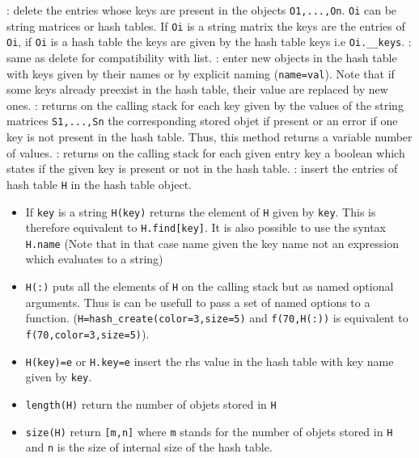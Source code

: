   \begin{varlist}
  : delete the entries whose keys are present in the objects
  \verb+O1,...,On+. \verb+Oi+ can be string matrices or hash tables. If \verb+Oi+ is 
  a string matrix the keys are the entries of \verb+Oi+, if \verb+Oi+ is a hash table the 
  keys are given by the hash table keys i.e \verb+Oi.__keys+.
  : same as delete for compatibility with list.
  : enter new objects in the hash table with keys 
  given by their names or by explicit naming (\verb+name=val+). Note that if some keys 
  already preexist in the hash table, their value are replaced by new ones. 
  : returns on the calling stack for each key given by the values of 
  the string matrices \verb+S1,...,Sn+ the corresponding stored objet if present or an 
  error if one key is not present in the hash table. Thus, this method returns a variable 
  number of values. 
  : returns on the calling stack for each given entry key a boolean 
  which states if the given key is present or not in the hash table.
  : insert the entries of hash table \verb+H+ in the hash table object.
  \end{varlist}

\begin{itemize}
\item If \verb+key+ is a string \verb+H(key)+ returns the element of \verb+H+ given by \verb+key+. 
  This is therefore equivalent to \verb+H.find[key]+. It is also possible to use 
  the syntax \verb+H.name+ (Note that in that case name given the key name not an expression 
  which evaluates to a string) 
\item \verb+H(:)+ puts all the elements of \verb+H+ on the calling stack but as named 
  optional arguments. Thus is can be usefull to pass a set of named options to a function. 
  (\verb+H=hash_create(color=3,size=5)+ and \verb+f(70,H(:))+ is equivalent to 
  \verb+f(70,color=3,size=5)+).
\item \verb+H(key)=e+ or \verb+H.key=e+ insert the rhs value in the hash table with key name 
  given by \verb+key+.
\end{itemize}

\begin{itemize}
   \item \verb+length(H)+ return the number of objets stored in \verb+H+
   \item \verb+size(H)+ return \verb+[m,n]+ where \verb+m+ stands for the number 
     of objets stored in \verb+H+ and \verb+n+ is the size of internal size of 
     the hash table. 
\end{itemize}

